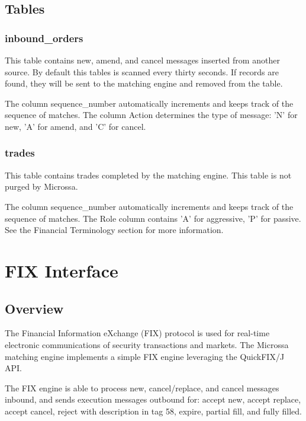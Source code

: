 \documentclass[Letter]{article}
\begin{document}
\subsection{Tables}

\subsubsection{inbound\_orders}

This table contains new, amend, and cancel messages inserted from another
source.  By default this tables is scanned every thirty seconds.  If
records are found, they will be sent to the matching engine and removed
from the table.

The column sequence\_number automatically increments and keeps track of the
sequence of matches.  The column Action determines the type of message:
'N' for new, 'A' for amend, and 'C' for cancel.

\subsubsection{trades}

This table contains trades completed by the matching engine.  This table
is not purged by Microssa.

The column sequence\_number automatically increments and keeps track of the
sequence of matches.  The Role column contains 'A' for aggressive, 'P' for
passive.  See the Financial Terminology section for more information.

\newpage
\section{FIX Interface}

\subsection{Overview}

The Financial Information eXchange (FIX) protocol is used for real-time
electronic communications of security transactions and markets. The Microssa
matching engine implements a simple FIX engine leveraging the QuickFIX/J API.

The FIX engine is able to process new, cancel/replace, and cancel messages
inbound, and sends execution messages outbound for: accept new, accept replace,
accept cancel, reject with description in tag 58, expire, partial fill, and
fully filled.
\end{document}
